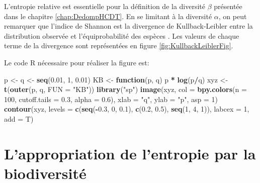 \documentclass[
  11pt,
  french,
  a4paper,
  extrafontsizes,onecolumn,openright
  ]{memoir}
\newenvironment{Shaded}{\begin{snugshade}}{\end{snugshade}}
\newcommand{\ControlFlowTok}[1]{\textcolor[rgb]{0.13,0.29,0.53}{\textbf{#1}}}
\newcommand{\DataTypeTok}[1]{\textcolor[rgb]{0.13,0.29,0.53}{#1}}
\newcommand{\DecValTok}[1]{\textcolor[rgb]{0.00,0.00,0.81}{#1}}
\newcommand{\FloatTok}[1]{\textcolor[rgb]{0.00,0.00,0.81}{#1}}
\newcommand{\KeywordTok}[1]{\textcolor[rgb]{0.13,0.29,0.53}{\textbf{#1}}}
\newcommand{\NormalTok}[1]{#1}
\newcommand{\OperatorTok}[1]{\textcolor[rgb]{0.81,0.36,0.00}{\textbf{#1}}}
\newcommand{\StringTok}[1]{\textcolor[rgb]{0.31,0.60,0.02}{#1}}
\begin{document}
\normalsize

L'entropie relative est essentielle pour la définition de la diversité \(\beta\) présentée dans le chapitre \ref{chap:DedompHCDT}.
En se limitant à la diversité \(\alpha\), on peut remarquer que l'indice de Shannon est la divergence de Kullback-Leibler entre la distribution observée et l'équiprobabilité des espèces \autocite{Marcon2012a}.
Les valeurs de chaque terme de la divergence sont représentées en figure \ref{fig:KullbackLeiblerFig}.

Le code R nécessaire pour réaliser la figure est:

\scriptsize

\begin{Shaded}
\begin{Highlighting}[]
\NormalTok{p <-}\StringTok{ }\NormalTok{q <-}\StringTok{ }\KeywordTok{seq}\NormalTok{(}\FloatTok{0.01}\NormalTok{, }\DecValTok{1}\NormalTok{, }\FloatTok{0.01}\NormalTok{)}
\NormalTok{KB <-}\StringTok{ }\ControlFlowTok{function}\NormalTok{(p, q) p }\OperatorTok{*}\StringTok{ }\KeywordTok{log}\NormalTok{(p}\OperatorTok{/}\NormalTok{q)}
\NormalTok{xyz <-}\StringTok{ }\KeywordTok{t}\NormalTok{(}\KeywordTok{outer}\NormalTok{(p, q, }\DataTypeTok{FUN =} \StringTok{"KB"}\NormalTok{))}
\KeywordTok{library}\NormalTok{(}\StringTok{"sp"}\NormalTok{)}
\KeywordTok{image}\NormalTok{(xyz, }\DataTypeTok{col =} \KeywordTok{bpy.colors}\NormalTok{(}\DataTypeTok{n =} \DecValTok{100}\NormalTok{, }\DataTypeTok{cutoff.tails =} \FloatTok{0.3}\NormalTok{, }\DataTypeTok{alpha =} \FloatTok{0.6}\NormalTok{), }
    \DataTypeTok{xlab =} \StringTok{"q"}\NormalTok{, }\DataTypeTok{ylab =} \StringTok{"p"}\NormalTok{, }\DataTypeTok{asp =} \DecValTok{1}\NormalTok{)}
\KeywordTok{contour}\NormalTok{(xyz, }\DataTypeTok{levels =} \KeywordTok{c}\NormalTok{(}\KeywordTok{seq}\NormalTok{(}\OperatorTok{-}\FloatTok{0.3}\NormalTok{, }\DecValTok{0}\NormalTok{, }\FloatTok{0.1}\NormalTok{), }\KeywordTok{c}\NormalTok{(}\FloatTok{0.2}\NormalTok{, }\FloatTok{0.5}\NormalTok{), }\KeywordTok{seq}\NormalTok{(}\DecValTok{1}\NormalTok{, }
    \DecValTok{4}\NormalTok{, }\DecValTok{1}\NormalTok{)), }\DataTypeTok{labcex =} \DecValTok{1}\NormalTok{, }\DataTypeTok{add =}\NormalTok{ T)}
\end{Highlighting}
\end{Shaded}

\normalsize

\hypertarget{lappropriation-de-lentropie-par-la-biodiversituxe9}{%
\section{L'appropriation de l'entropie par la biodiversité}\label{lappropriation-de-lentropie-par-la-biodiversituxe9}}
\end{document}
